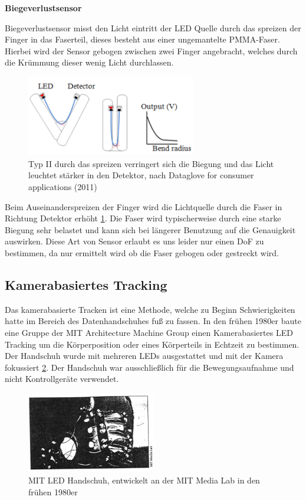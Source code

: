 \begin{center}
\textbf{Biegeverlustsensor}
\end{center}
Biegeverlustsensor misst den Licht eintritt der LED Quelle durch das spreizen der Finger in das Faserteil, dieses besteht aus einer ungemantelte PMMA-Faser. Hierbei wird der Sensor gebogen zwischen zwei Finger angebracht, welches durch die Krümmung dieser wenig Licht durchlassen. 
\begin{figure}[h]
	\centering
    \includegraphics[height=100pt]{Bachelorarbeit/images/BendingLoss.png}
    \caption{Typ II durch das spreizen verringert sich die Biegung und das Licht leuchtet stärker in den Detektor, nach Dataglove for consumer applications (2011)}
    \label{fig:BendingLoss}
\end{figure}
\bigskip

Beim Auseinanderspreizen der Finger wird die Lichtquelle durch die Faser in Richtung Detektor erhöht \ref{fig:BendingLoss}. Die Faser wird typischerweise durch eine starke Biegung sehr belastet und kann sich bei längerer Benutzung auf die Genauigkeit auswirken. 
Diese Art von Sensor erlaubt es uns leider nur einen DoF zu bestimmen, da nur ermittelt wird ob die Faser gebogen oder gestreckt wird.



\subsection{Kamerabasiertes Tracking}
Das kamerabasierte Tracken ist eine Methode, welche zu Beginn Schwierigkeiten hatte im Bereich des Datenhandschuhes fuß zu fassen. In den frühen 1980er baute eine Gruppe der MIT Architecture Machine Group \parencite{ASurveyOfGlove-basedInput} einen Kamerabasiertes LED Tracking um die Körperposition oder eines Körperteils in Echtzeit zu bestimmen. Der Handschuh wurde mit mehreren LEDs ausgestattet und mit der Kamera fokussiert \ref{fig:MITLED}. Der Handschuh war ausschließlich für die Bewegungsaufnahme und nicht Kontrollgeräte verwendet.

\begin{figure}[h]
	\centering
    \includegraphics[height=100pt]{Bachelorarbeit/images/MITLED.png}
    \caption{MIT LED Handschuh, entwickelt an der MIT Media Lab in den frühen 1980er}
    \label{fig:MITLED}
\end{figure}
\bigskip

